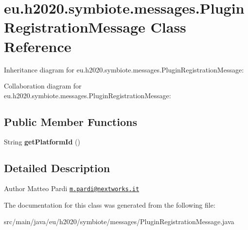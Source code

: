 \hypertarget{classeu_1_1h2020_1_1symbiote_1_1messages_1_1PluginRegistrationMessage}{}\section{eu.\+h2020.\+symbiote.\+messages.\+Plugin\+Registration\+Message Class Reference}
\label{classeu_1_1h2020_1_1symbiote_1_1messages_1_1PluginRegistrationMessage}


Inheritance diagram for eu.\+h2020.\+symbiote.\+messages.\+Plugin\+Registration\+Message\+:


Collaboration diagram for eu.\+h2020.\+symbiote.\+messages.\+Plugin\+Registration\+Message\+:
\subsection*{Public Member Functions}
\begin{DoxyCompactItemize}
\item 
\mbox{\label{classeu_1_1h2020_1_1symbiote_1_1messages_1_1PluginRegistrationMessage_a72205ca0cdfab8d3bee1d4f76943f279}} 
String {\bfseries get\+Platform\+Id} ()
\end{DoxyCompactItemize}


\subsection{Detailed Description}
\begin{DoxyAuthor}{Author}
Matteo Pardi \href{mailto:m.pardi@nextworks.it}{\tt m.\+pardi@nextworks.\+it} 
\end{DoxyAuthor}


The documentation for this class was generated from the following file\+:\begin{DoxyCompactItemize}
\item 
src/main/java/eu/h2020/symbiote/messages/Plugin\+Registration\+Message.\+java\end{DoxyCompactItemize}
